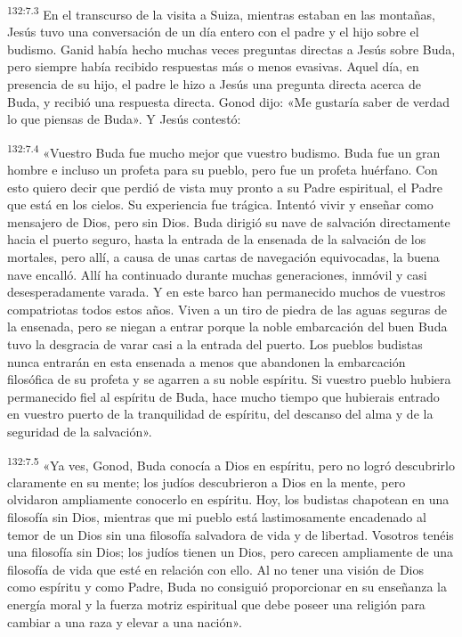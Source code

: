 \par 
\textsuperscript{132:7.3} En el transcurso de la visita a Suiza, mientras estaban en las montañas, Jesús tuvo una conversación de un día entero con el padre y el hijo sobre el budismo. Ganid había hecho muchas veces preguntas directas a Jesús sobre Buda, pero siempre había recibido respuestas más o menos evasivas. Aquel día, en presencia de su hijo, el padre le hizo a Jesús una pregunta directa acerca de Buda, y recibió una respuesta directa. Gonod dijo: «Me gustaría saber de verdad lo que piensas de Buda». Y Jesús contestó:

\par 
\textsuperscript{132:7.4} «Vuestro Buda fue mucho mejor que vuestro budismo. Buda fue un gran hombre e incluso un profeta para su pueblo, pero fue un profeta huérfano. Con esto quiero decir que perdió de vista muy pronto a su Padre espiritual, el Padre que está en los cielos. Su experiencia fue trágica. Intentó vivir y enseñar como mensajero de Dios, pero sin Dios. Buda dirigió su nave de salvación directamente hacia el puerto seguro, hasta la entrada de la ensenada de la salvación de los mortales, pero allí, a causa de unas cartas de navegación equivocadas, la buena nave encalló. Allí ha continuado durante muchas generaciones, inmóvil y casi desesperadamente varada. Y en este barco han permanecido muchos de vuestros compatriotas todos estos años. Viven a un tiro de piedra de las aguas seguras de la ensenada, pero se niegan a entrar porque la noble embarcación del buen Buda tuvo la desgracia de varar casi a la entrada del puerto. Los pueblos budistas nunca entrarán en esta ensenada a menos que abandonen la embarcación filosófica de su profeta y se agarren a su noble espíritu. Si vuestro pueblo hubiera permanecido fiel al espíritu de Buda, hace mucho tiempo que hubierais entrado en vuestro puerto de la tranquilidad de espíritu, del descanso del alma y de la seguridad de la salvación».

\par 
\textsuperscript{132:7.5} «Ya ves, Gonod, Buda conocía a Dios en espíritu, pero no logró descubrirlo claramente en su mente; los judíos descubrieron a Dios en la mente, pero olvidaron ampliamente conocerlo en espíritu. Hoy, los budistas chapotean en una filosofía sin Dios, mientras que mi pueblo está lastimosamente encadenado al temor de un Dios sin una filosofía salvadora de vida y de libertad. Vosotros tenéis una filosofía sin Dios; los judíos tienen un Dios, pero carecen ampliamente de una filosofía de vida que esté en relación con ello. Al no tener una visión de Dios como espíritu y como Padre, Buda no consiguió proporcionar en su enseñanza la energía moral y la fuerza motriz espiritual que debe poseer una religión para cambiar a una raza y elevar a una nación».

